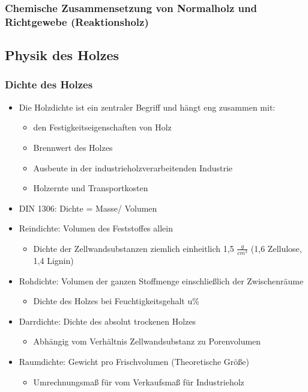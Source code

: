 \documentclass[12pt]{article}
\begin{document}
\subsubsection{Chemische Zusammensetzung von Normalholz und Richtgewebe
(Reaktionsholz)}

\subsection{Physik des Holzes}
\subsubsection{Dichte des Holzes}
\begin{itemize}
  \item Die Holzdichte ist ein zentraler Begriff und hängt eng  zusammen mit:
  \begin{itemize}
    \item den Festigkeitseigenschaften von Holz 
    \item Brennwert des Holzes
    \item Ausbeute in der industrieholzverarbeitenden Industrie
    \item Holzernte und Transportkosten
  \end{itemize}
  \item DIN 1306: Dichte = Masse/ Volumen
  \item Reindichte: Volumen des Feststoffes allein
  \begin{itemize}
    \item Dichte der Zellwandsubstanzen ziemlich einheitlich 1,5 $\frac{g}{cm^3}$ (1,6
    Zellulose, 1,4 Lignin)
  \end{itemize}
  \item Rohdichte: Volumen der ganzen Stoffmenge einschließlich der
  Zwischenräume
  \begin{itemize}
    \item Dichte des Holzes bei Feuchtigkeitsgehalt u\%
  \end{itemize}
  \item Darrdichte: Dichte des absolut trockenen Holzes
  \begin{itemize}
    \item Abhängig vom Verhältnis Zellwandsubstanz zu Porenvolumen
  \end{itemize}
  \item Raumdichte: Gewicht pro Frischvolumen (Theoretische Größe)
  \begin{itemize}
    \item Umrechnungsmaß für vom Verkaufsmaß für Industrieholz
    \end{itemize}
  \end{itemize}
 
\end{document}

